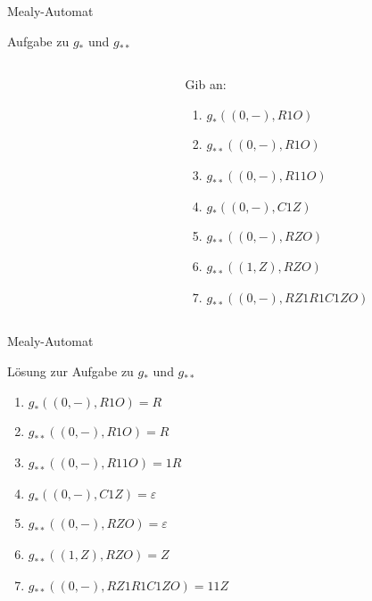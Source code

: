 \begin{frame}[fragile]{Mealy-Automat}
\begin{exampleblock}{Aufgabe zu $g_{\ast}$ und $g_{\ast\ast}$}
\begin{columns}
\begin{column}{0.6\textwidth}
\begin{figure}[ht]
\end{figure}
			\end{column}
			\begin{column}{0.4\textwidth}
			\small
				Gib an:
				\begin{enumerate}
					\item $g_{\ast}((0,-), R1O)$
					\item $g_{\ast\ast}((0,-), R1O)$
					\item $g_{\ast\ast}((0,-), R11O)$
					\item $g_{\ast}((0,-), C1Z)$
					\item $g_{\ast\ast}((0,-), RZO)$
					\item $g_{\ast\ast}((1,Z), RZO)$
					\item $g_{\ast\ast}((0,-), RZ1R1C1ZO)$
				\end{enumerate}
			\end{column}
		\end{columns}
	\end{exampleblock}
\end{frame}

\begin{frame}{Mealy-Automat}
	\begin{block}{Lösung zur Aufgabe zu $g_{\ast}$ und $g_{\ast\ast}$}
		\begin{enumerate}
					\item $g_{\ast}((0,-), R1O) = R$
					\item $g_{\ast\ast}((0,-), R1O) = R$
					\item $g_{\ast\ast}((0,-), R11O) = 1R$
					\item $g_{\ast}((0,-), C1Z) = \varepsilon$
					\item $g_{\ast\ast}((0,-), RZO) = \varepsilon$
					\item $g_{\ast\ast}((1,Z), RZO) = Z $
					\item $g_{\ast\ast}((0,-), RZ1R1C1ZO)= 11Z$
				\end{enumerate}
	\end{block}
\end{frame}




